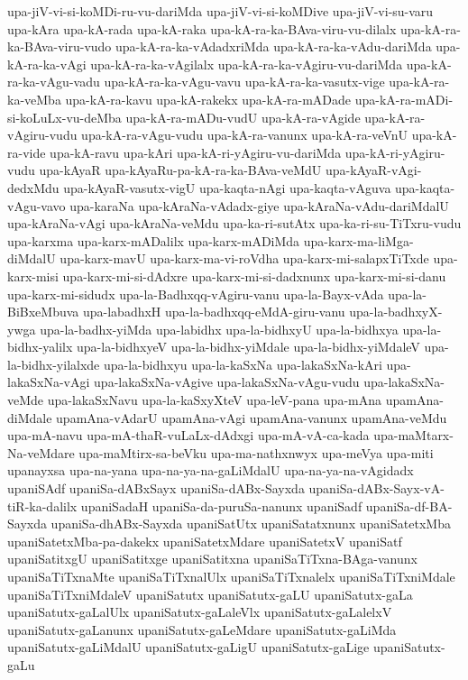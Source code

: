 {upa-jiV-vi-si-koMDi-ru-vu-dariMda
upa-jiV-vi-si-koMDive
upa-jiV-vi-su-varu
upa-kAra
upa-kA-rada
upa-kA-raka
upa-kA-ra-ka-BAva-viru-vu-dilalx
upa-kA-ra-ka-BAva-viru-vudo
upa-kA-ra-ka-vAdadxriMda
upa-kA-ra-ka-vAdu-dariMda
upa-kA-ra-ka-vAgi
upa-kA-ra-ka-vAgilalx
upa-kA-ra-ka-vAgiru-vu-dariMda
upa-kA-ra-ka-vAgu-vadu
upa-kA-ra-ka-vAgu-vavu
upa-kA-ra-ka-vasutx-vige
upa-kA-ra-ka-veMba
upa-kA-ra-kavu
upa-kA-rakekx
upa-kA-ra-mADade
upa-kA-ra-mADi-si-koLuLx-vu-deMba
upa-kA-ra-mADu-vudU
upa-kA-ra-vAgide
upa-kA-ra-vAgiru-vudu
upa-kA-ra-vAgu-vudu
upa-kA-ra-vanunx
upa-kA-ra-veVnU
upa-kA-ra-vide
upa-kA-ravu
upa-kAri
upa-kA-ri-yAgiru-vu-dariMda
upa-kA-ri-yAgiru-vudu
upa-kAyaR
upa-kAyaRu-pa-kA-ra-ka-BAva-veMdU
upa-kAyaR-vAgi-dedxMdu
upa-kAyaR-vasutx-vigU
upa-kaqta-nAgi
upa-kaqta-vAguva
upa-kaqta-vAgu-vavo
upa-karaNa
upa-kAraNa-vAdadx-giye
upa-kAraNa-vAdu-dariMdalU
upa-kAraNa-vAgi
upa-kAraNa-veMdu
upa-ka-ri-sutAtx
upa-ka-ri-su-TiTxru-vudu
upa-karxma
upa-karx-mADalilx
upa-karx-mADiMda
upa-karx-ma-liMga-diMdalU
upa-karx-mavU
upa-karx-ma-vi-roVdha
upa-karx-mi-salapxTiTxde
upa-karx-misi
upa-karx-mi-si-dAdxre
upa-karx-mi-si-dadxnunx
upa-karx-mi-si-danu
upa-karx-mi-sidudx
upa-la-Badhxqq-vAgiru-vanu
upa-la-Bayx-vAda
upa-la-BiBxeMbuva
upa-labadhxH
upa-la-badhxqq-eMdA-giru-vanu
upa-la-badhxyX-ywga
upa-la-badhx-yiMda
upa-labidhx
upa-la-bidhxyU
upa-la-bidhxya
upa-la-bidhx-yalilx
upa-la-bidhxyeV
upa-la-bidhx-yiMdale
upa-la-bidhx-yiMdaleV
upa-la-bidhx-yilalxde
upa-la-bidhxyu
upa-la-kaSxNa
upa-lakaSxNa-kAri
upa-lakaSxNa-vAgi
upa-lakaSxNa-vAgive
upa-lakaSxNa-vAgu-vudu
upa-lakaSxNa-veMde
upa-lakaSxNavu
upa-la-kaSxyXteV
upa-leV-pana
upa-mAna
upamAna-diMdale
upamAna-vAdarU
upamAna-vAgi
upamAna-vanunx
upamAna-veMdu
upa-mA-navu
upa-mA-thaR-vuLaLx-dAdxgi
upa-mA-vA-ca-kada
upa-maMtarx-Na-veMdare
upa-maMtirx-sa-beVku
upa-ma-nathxnwyx
upa-meVya
upa-miti
upanayxsa
upa-na-yana
upa-na-ya-na-gaLiMdalU
upa-na-ya-na-vAgidadx
upaniSAdf
upaniSa-dABxSayx
upaniSa-dABx-Sayxda
upaniSa-dABx-Sayx-vA-tiR-ka-dalilx
upaniSadaH
upaniSa-da-puruSa-nanunx
upaniSadf
upaniSa-df-BA-Sayxda
upaniSa-dhABx-Sayxda
upaniSatUtx
upaniSatatxnunx
upaniSatetxMba
upaniSatetxMba-pa-dakekx
upaniSatetxMdare
upaniSatetxV
upaniSatf
upaniSatitxgU
upaniSatitxge
upaniSatitxna
upaniSaTiTxna-BAga-vanunx
upaniSaTiTxnaMte
upaniSaTiTxnalUlx
upaniSaTiTxnalelx
upaniSaTiTxniMdale
upaniSaTiTxniMdaleV
upaniSatutx
upaniSatutx-gaLU
upaniSatutx-gaLa
upaniSatutx-gaLalUlx
upaniSatutx-gaLaleVlx
upaniSatutx-gaLalelxV
upaniSatutx-gaLanunx
upaniSatutx-gaLeMdare
upaniSatutx-gaLiMda
upaniSatutx-gaLiMdalU
upaniSatutx-gaLigU
upaniSatutx-gaLige
upaniSatutx-gaLu
}
